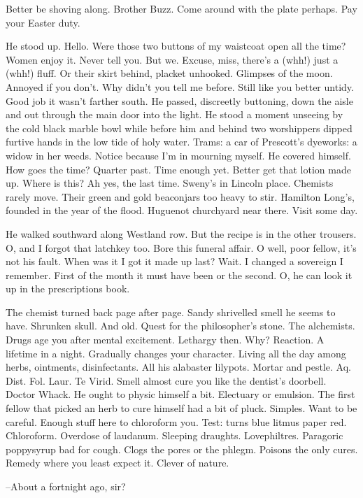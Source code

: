 Better be shoving along.
Brother Buzz.
Come around with the plate perhaps.
Pay your Easter duty.

He stood up.
Hello.
Were those two buttons of my waistcoat open all the time?
Women enjoy it.
Never tell you.
But we.
Excuse, miss, there's a (whh!)
just a (whh!) fluff.
Or their skirt behind, placket unhooked.
Glimpses of the moon.
Annoyed if you don't.
Why didn't you tell me before.
Still like you better untidy.
Good job it wasn't farther south.
He passed, discreetly buttoning,
down the aisle and out through the main door into the light.
He stood a moment unseeing
by the cold black marble bowl
while before him and behind
two worshippers dipped furtive hands in the low tide of holy water.
Trams:
a car of Prescott's dyeworks:
a widow in her  weeds.
Notice because I'm in mourning myself.
He covered himself.
How goes the time?
Quarter past.
Time enough yet.
Better get that lotion made up.
Where is this?
Ah yes, the last time.
Sweny's in Lincoln place.
Chemists rarely move.
Their green and gold beaconjars too heavy to stir.
Hamilton Long's, founded in the year of the flood.
Huguenot churchyard near there.
Visit some day.

He walked southward along Westland row.
But the recipe is in the other trousers.
O, and I forgot that latchkey too.
Bore
this funeral affair.
O well, poor fellow,
it's not his fault.
When was it I got it made up last?
Wait.
I changed a sovereign I remember.
First of the month it must have been
or the second.
O, he can look it up in the prescriptions book.

The chemist turned back page after page.
Sandy shrivelled smell he seems to have.
Shrunken skull.
And old.
Quest for the philosopher's stone.
The alchemists.
Drugs age you after mental excitement.
Lethargy then.
Why?
Reaction.
A lifetime in a night.
Gradually changes your character.
Living all the day among herbs, ointments, disinfectants.
All his alabaster lilypots.
Mortar and pestle.
Aq.
Dist.
Fol.
Laur.
Te Virid.
Smell almost cure you like the dentist's doorbell.
Doctor Whack.
He ought to physic himself a bit.
Electuary or emulsion.
The first fellow that picked an herb to cure himself had a bit of pluck.
Simples.
Want to be
careful.
Enough stuff here to chloroform you.
Test: turns blue litmus paper red.
Chloroform.
Overdose of laudanum.
Sleeping draughts.
Lovephiltres.
Paragoric poppysyrup bad for cough.
Clogs the pores or the phlegm.
Poisons the only cures.
Remedy where you least expect it.
Clever of nature.

--About a fortnight ago, sir?


